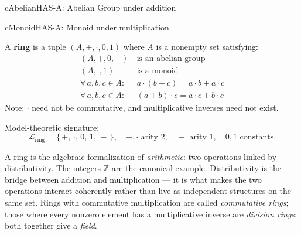 \noindent
\begin{minipage}[t]{0.485\linewidth}
  \begin{bpinh}{cAbelian}{HAS-A: Abelian Group under addition}
  \end{bpinh}
\end{minipage}%
\hfill
\begin{minipage}[t]{0.485\linewidth}
  \begin{bpinh}{cMonoid}{HAS-A: Monoid under multiplication}
  \end{bpinh}
\end{minipage}

\begin{definition}[Ring]
\label{def:formal-model-theoretic-structures-l635}
  A \textbf{ring} is a tuple $(A, +, \cdot, 0, 1)$ where $A$ is a nonempty set
  satisfying:
  \begin{align*}
    (A,+,0,-)\  &\text{is an abelian group} \tag{Ab.\ Group under $+$}\\
    (A,\cdot,1)\ &\text{is a monoid} \tag{Monoid under $\cdot$}\\
    \forall\,a,b,c \in A:\ &a\cdot(b+c) = a\cdot b + a\cdot c \tag{Left Distributivity}\\
    \forall\,a,b,c \in A:\ &(a+b)\cdot c = a\cdot c + b\cdot c \tag{Right Distributivity}
  \end{align*}
  Note: $\cdot$ need not be commutative, and multiplicative inverses need not
  exist.

  \medskip\noindent
  Model-theoretic signature:
  \[
    \mathcal{L}_{\mathrm{ring}} = \{\,+,\,\cdot,\,0,\,1,\,-\,\},
    \quad +,\cdot \text{ arity } 2,\quad - \text{ arity } 1,\quad
    0,1 \text{ constants.}
  \]
\end{definition}

\begin{remark}
  A ring is the algebraic formalization of \emph{arithmetic}: two operations
  linked by distributivity.  The integers $\mathbb{Z}$ are the canonical
  example.  Distributivity is the bridge between addition and multiplication ---
  it is what makes the two operations interact coherently rather than live as
  independent structures on the same set.  Rings with commutative multiplication
  are called \emph{commutative rings}; those where every nonzero element has a
  multiplicative inverse are \emph{division rings}; both together give a
  \emph{field}.
\end{remark}

